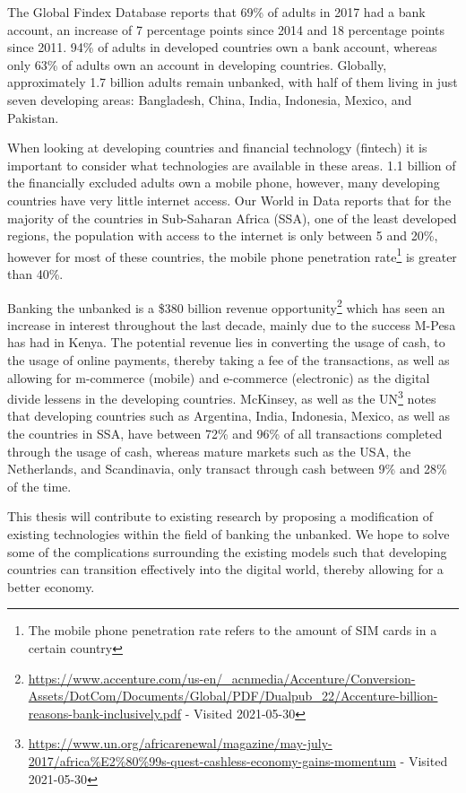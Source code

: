 \documentclass[11pt, a4paper]{article}
\begin{document}
The Global Findex Database reports that 69\% of adults in 2017 had a bank account\cite{gfindex}, an increase of 7 percentage points since 2014 and 18 percentage points since 2011\cite{gfindex}. 94\% of adults in developed countries own a bank account, whereas only 63\% of adults own an account in developing countries\cite{gfindex}. Globally, approximately 1.7 billion adults remain unbanked, with half of them living in just seven developing areas: Bangladesh, China, India, Indonesia, Mexico, and Pakistan.

When looking at developing countries and financial technology (fintech) it is important to consider what technologies are available in these areas. 1.1 billion of the financially excluded adults own a mobile phone\cite{gfindex}, however, many developing countries have very little internet access. Our World in Data reports that for the majority of the countries in Sub-Saharan Africa (SSA), one of the least developed regions, the population with access to the internet is only between 5 and 20\%\cite{owidinternet}, however for most of these countries, the mobile phone penetration rate\footnote{The mobile phone penetration rate refers to the amount of SIM cards in a certain country} is greater than 40\%\cite{owidinternet}.

Banking the unbanked is a \$380 billion revenue opportunity\footnote{\url{https://www.accenture.com/us-en/\_acnmedia/Accenture/Conversion-Assets/DotCom/Documents/Global/PDF/Dualpub\_22/Accenture-billion-reasons-bank-inclusively.pdf} - Visited 2021-05-30} which has seen an increase in interest throughout the last decade, mainly due to the success M-Pesa has had in Kenya. The potential revenue lies in converting the usage of cash, to the usage of online payments, thereby taking a fee of the transactions, as well as allowing for m-commerce (mobile) and e-commerce (electronic) as the digital divide lessens in the developing countries. McKinsey\cite{mckinsey}, as well as the UN\footnote{\url{https://www.un.org/africarenewal/magazine/may-july-2017/africa\%E2\%80\%99s-quest-cashless-economy-gains-momentum} - Visited 2021-05-30} notes that developing countries such as Argentina, India, Indonesia, Mexico, as well as the countries in SSA, have between 72\% and 96\% of all transactions completed through the usage of cash, whereas mature markets such as the USA, the Netherlands, and Scandinavia, only transact through cash between 9\% and 28\% of the time.

This thesis will contribute to existing research by proposing a modification of existing technologies within the field of banking the unbanked. We hope to solve some of the complications surrounding the existing models such that developing countries can transition effectively into the digital world, thereby allowing for a better economy.
\end{document}
